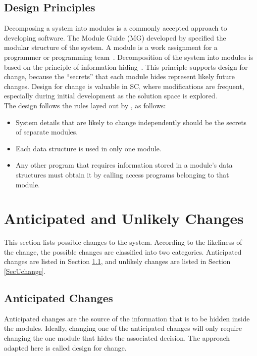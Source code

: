 \documentclass[12pt, titlepage]{article}
\begin{document}
\subsection{Design Principles}
Decomposing a system into modules is a commonly accepted approach to developing
software.  The Module Guide (MG) developed by \citep{ParnasEtAl1984} specified the modular structure of the system. A module is a work assignment for a programmer or programming team~\citep{ParnasEtAl1984}.  Decomposition of the system into modules is
based on the principle of information hiding~\citep{Parnas1972a}.  This
principle supports design for change, because the ``secrets'' that each module
hides represent likely future changes.  Design for change is valuable in SC,
where modifications are frequent, especially during initial development as the
solution space is explored.\\

The design follows the rules layed out by \citet{ParnasEtAl1984}, as follows:
\begin{itemize}
\item System details that are likely to change independently should be the
  secrets of separate modules.
\item Each data structure is used in only one module.
\item Any other program that requires information stored in a module's data
  structures must obtain it by calling access programs belonging to that module.
\end{itemize}

\section{Anticipated and Unlikely Changes} \label{SecChange}

This section lists possible changes to the system. According to the likeliness
of the change, the possible changes are classified into two
categories. Anticipated changes are listed in Section \ref{SecAchange}, and
unlikely changes are listed in Section \ref{SecUchange}.

\subsection{Anticipated Changes} \label{SecAchange}

Anticipated changes are the source of the information that is to be hidden
inside the modules. Ideally, changing one of the anticipated changes will only
require changing the one module that hides the associated decision. The approach
adapted here is called design for
change.
\end{document}
